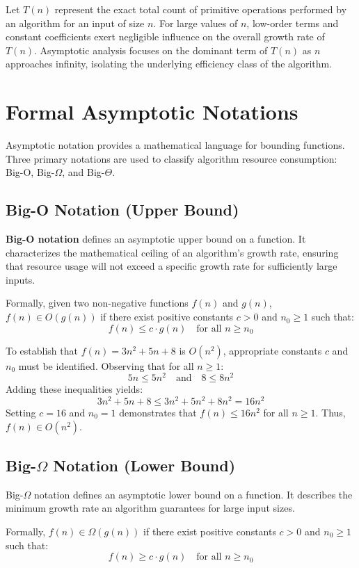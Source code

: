 \documentclass[12pt]{report}
\begin{document}
Let $T(n)$ represent the exact total count of primitive operations performed by an algorithm for an input of size $n$. For large values of $n$, low-order terms and constant coefficients exert negligible influence on the overall growth rate of $T(n)$. Asymptotic analysis focuses on the dominant term of $T(n)$ as $n$ approaches infinity, isolating the underlying efficiency class of the algorithm.

\section{Formal Asymptotic Notations}

Asymptotic notation provides a mathematical language for bounding functions. Three primary notations are used to classify algorithm resource consumption: Big-O, Big-$\Omega$, and Big-$\Theta$.

\subsection{Big-O Notation (Upper Bound)}

\textbf{Big-O notation} defines an asymptotic upper bound on a function. It characterizes the mathematical ceiling of an algorithm's growth rate, ensuring that resource usage will not exceed a specific growth rate for sufficiently large inputs.

Formally, given two non-negative functions $f(n)$ and $g(n)$, $f(n) \in O(g(n))$ if there exist positive constants $c > 0$ and $n_0 \ge 1$ such that:
\[
f(n) \le c \cdot g(n) \quad \text{for all } n \ge n_0
\]

To establish that $f(n) = 3n^2 + 5n + 8$ is $O(n^2)$, appropriate constants $c$ and $n_0$ must be identified. Observing that for all $n \ge 1$:
\[
5n \le 5n^2 \quad \text{and} \quad 8 \le 8n^2
\]
Adding these inequalities yields:
\[
3n^2 + 5n + 8 \le 3n^2 + 5n^2 + 8n^2 = 16n^2
\]
Setting $c = 16$ and $n_0 = 1$ demonstrates that $f(n) \le 16n^2$ for all $n \ge 1$. Thus, $f(n) \in O(n^2)$.

\subsection{Big-$\Omega$ Notation (Lower Bound)}

Big-$\Omega$ notation defines an asymptotic lower bound on a function. It describes the minimum growth rate an algorithm guarantees for large input sizes.

Formally, $f(n) \in \Omega(g(n))$ if there exist positive constants $c > 0$ and $n_0 \ge 1$ such that:
\[
f(n) \ge c \cdot g(n) \quad \text{for all } n \ge n_0
\]
\end{document}
